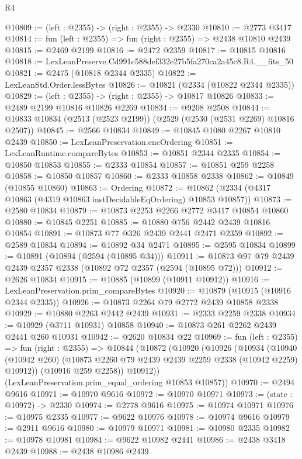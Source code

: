 \begin{lexlean}{R4}
\begin{coremodule}
@10809 := (left : @2355) -> (right : @2355) -> @2330
@10810 := @2773 @3417
@10814 := fun (left : @2355) => fun (right : @2355) => @2438 @10810 @2439
@10815 := @2469 @2199
@10816 := @2472 @2359
@10817 := @10815 @10816
@10818 := LexLeanPreserve.Cd991c588def332e27b5fa270ca2a45c8.R4.__fits_50
@10821 := @2475 (@10818 @2344 @2335)
@10822 := LexLeanStd.Order.lessBytes
@10826 := @10821 (@2334 (@10822 @2344 @2335))
@10829 := (left : @2355) -> (right : @2355) -> @10817 @10826
@10833 := @2489 @2199 @10816 @10826 @2269
@10834 := @9208 @2508
@10844 := @10833 @10834 (@2513 (@2523 @2199)) (@2529 (@2530 (@2531 @2269) @10816 @2507))
@10845 := @2566 @10834
@10849 := @10845 @1080 @2267 @10810 @2439
@10850 := LexLeanPreservation.encOrdering
@10851 := LexLeanRuntime.compareBytes
@10853 := @10851 @2344 @2335
@10854 := @10850 @10853
@10855 := @2333 @10854
@10857 := @10851 @259 @2258
@10858 := @10850 @10857
@10860 := @2333 @10858 @2338
@10862 := @10849 (@10855 @10860)
@10863 := Ordering
@10872 := @10862 (@2334 (@4317 @10863 (@4319 @10863 instDecidableEqOrdering) @10853 @10857))
@10873 := @2580 @10834
@10879 := @10873 @2253 @2266 @2772 @3417 @10854 @10860
@10880 := @10845 @2251
@10885 := @10880 @756 @2442 @2439 @10816 @10854
@10891 := @10873 @77 @326 @2439 @2441 @2471 @2359
@10892 := @2589 @10834
@10894 := @10892 @34 @2471
@10895 := @2595 @10834
@10899 := @10891 (@10894 (@2594 (@10895 @34)))
@10911 := @10873 @97 @79 @2439 @2439 @2357 @2338 (@10892 @72 @2357 (@2594 (@10895 @72)))
@10912 := @2626 @10834
@10915 := @10885 (@10899 (@10911 @10912))
@10916 := LexLeanPreservation.prim_compareBytes
@10920 := @10879 (@10915 (@10916 @2344 @2335))
@10926 := @10873 @2264 @79 @2772 @2439 @10858 @2338
@10929 := @10880 @2263 @2442 @2439
@10931 := @2333 @2259 @2338
@10934 := @10929 (@3711 @10931) @10858
@10940 := @10873 @261 @2262 @2439 @2441 @260 @10931
@10942 := @2620 @10834 @22
@10969 := fun (left : @2355) =>
  fun (right : @2355) =>
  @10844
    (@10872
      (@10920
        (@10926
          (@10934
            (@10940 (@10942 @260) (@10873 @2260 @79 @2439 @2439 @2259 @2338 (@10942 @2259) @10912))
            (@10916 @259 @2258))
          @10912))
      (LexLeanPreservation.prim_equal_ordering @10853 @10857))
@10970 := @2494 @9616
@10971 := @10970 @9616
@10972 := @10970 @10971
@10973 := (state : @10972) -> @2330
@10974 := @2778 @9616
@10975 := @10974 @10971
@10976 := @10975 @2335
@10977 := @9622 @10976
@10978 := @10974 @9616
@10979 := @2911 @9616
@10980 := @10979 @10971
@10981 := @10980 @2335
@10982 := @10978 @10981
@10984 := @9622 @10982 @2441
@10986 := @2438 @3418 @2439
@10988 := @2438 @10986 @2439

\end{coremodule}
\end{lexlean}
